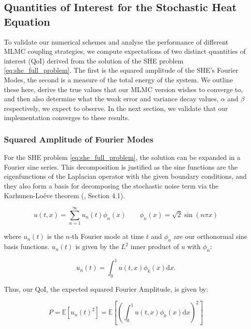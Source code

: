\subsection{Quantities of Interest for the Stochastic Heat Equation}\label{sec:QoI_for_SHE}

To validate our numerical schemes and analyse the performance 
of different MLMC coupling strategies, we compute expectations
of two distinct quantities of interest (QoI) derived from the solution 
of the SHE problem \eqref{eq:she_full_problem}.
The first is the squared amplitude of the SHE's Fourier Modes,
the second is a measure of the total energy of the 
system. We outline these here, derive the true values that
our MLMC version wishes to converge to, and then also 
determine what the weak error and variance decay values, $\alpha$ and 
$\beta$ respectively, we expect to observe. In the next section,
we validate that our implementation converges to these results. 

\subsubsection{Squared Amplitude of Fourier Modes}

For the SHE problem \eqref{eq:she_full_problem}, 
the solution can be expanded in a Fourier sine series. This 
decomposition is justified 
as the sine functions are the eigenfunctions of the Laplacian 
operator with the given boundary conditions, and they also form a basis 
for decomposing the stochastic noise term via the Karhunen-Loéve theorem
(\cite{da2014stochastic}, Section 4.1).

\begin{equation*}
    u(t,x) = \sum_{n=1}^\infty u_n(t)\phi_n(x) \qquad \phi_n(x) = \sqrt{2}\sin (n\pi x)
\end{equation*}

where $u_n(t)$ is the $n$-th Fourier mode at time $t$ and $\phi_n$ are our 
orthonormal sine basis functions. $u_n(t)$ is given by the $L^2$ 
inner product of $u$ with $\phi_n$:

\begin{equation*}
    u_n(t) = \int_0^1 u(t,x)\phi_k(x)\mathrm{d}x.
\end{equation*}

Thus, our QoI, the expected squared Fourier Amplitude, is given by:

\begin{equation*}
    P = \mathbb{E}\left[u_n(t)^2\right] = 
    \mathbb{E}\left[\left(\int_0^1 u(t,x)\phi_k(x)\mathrm{d}x\right)^2\right]
\end{equation*}

